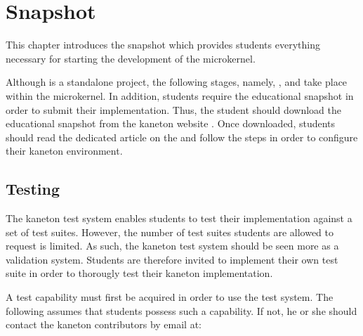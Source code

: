 %
%
%
%
%
%

%
%

\chapter{Snapshot}
\label{chapter:snapshot}

This chapter introduces the snapshot which provides students everything
necessary for starting the development of the  microkernel.

\newpage

%
%

Although  is a standalone project, the following stages, namely,
,  and  take place within the microkernel. In
addition, students require the educational snapshot in order to submit
their implementation. Thus, the student should download the educational
snapshot from the kaneton website . Once
downloaded, students should read the dedicated article on the 
 and follow the steps in order to configure their kaneton
environment.

%
%

\section{Testing}

The kaneton test system enables students to test their implementation against
a set of test suites. However, the number of test suites students are allowed
to request is limited. As such, the kaneton test system should be seen more as
a validation system. Students are therefore invited to implement their own
test suite in order to thorougly test their kaneton implementation.

A test capability must first be acquired in order to use the test system. The
following assumes that students possess such a capability. If not, he or
she should contact the kaneton contributors by email at:

